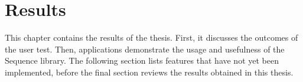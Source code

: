 \chapter{Results}
\label{chap:results}
This chapter contains the results of the thesis. First, it discusses the
outcomes of the user test. Then, applications demonstrate the usage and
usefulness of the Sequence library. The following section lists features that
have not yet been implemented, before the final section reviews the results
obtained in this thesis. 




